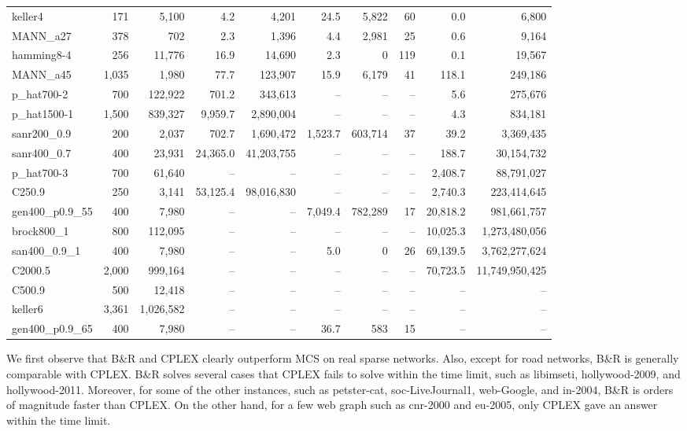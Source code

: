 \documentclass[11pt]{article}
\begin{document}
{\begin{table}[p]
\begin{tabular}{lrr|rr|rrr|rr}
keller4 & 171 & 5,100 & 4.2 & 4,201 & 24.5 & 5,822 & 60 & 0.0 & 6,800 \\
MANN\_a27 & 378 & 702 & 2.3 & 1,396 & 4.4 & 2,981 & 25 & 0.6 & 9,164 \\
hamming8-4 & 256 & 11,776 & 16.9 & 14,690 & 2.3 & 0 & 119 & 0.1 & 19,567 \\
MANN\_a45 & 1,035 & 1,980 & 77.7 & 123,907 & 15.9 & 6,179 & 41 & 118.1 & 249,186 \\
p\_hat700-2 & 700 & 122,922 & 701.2 & 343,613 & -- & -- & -- & 5.6 & 275,676 \\
p\_hat1500-1 & 1,500 & 839,327 & 9,959.7 & 2,890,004 & -- & -- & -- & 4.3 & 834,181 \\
sanr200\_0.9 & 200 & 2,037 & 702.7 & 1,690,472 & 1,523.7 & 603,714 & 37 & 39.2 & 3,369,435 \\
sanr400\_0.7 & 400 & 23,931 & 24,365.0 & 41,203,755 & -- & -- & -- & 188.7 & 30,154,732 \\
p\_hat700-3 & 700 & 61,640 & -- & -- & -- & -- & -- & 2,408.7 & 88,791,027 \\
C250.9 & 250 & 3,141 & 53,125.4 & 98,016,830 & -- & -- & -- & 2,740.3 & 223,414,645 \\
gen400\_p0.9\_55 & 400 & 7,980 & -- & -- & 7,049.4 & 782,289 & 17 & 20,818.2 & 981,661,757 \\
brock800\_1 & 800 & 112,095 & -- & -- & -- & -- & -- & 10,025.3 & 1,273,480,056 \\
san400\_0.9\_1 & 400 & 7,980 & -- & -- & 5.0 & 0 & 26 & 69,139.5 & 3,762,277,624 \\
C2000.5 & 2,000 & 999,164 & -- & -- & -- & -- & -- & 70,723.5 & 11,749,950,425 \\
C500.9 & 500 & 12,418 & -- & -- & -- & -- & -- & -- & -- \\
keller6 & 3,361 & 1,026,582 & -- & -- & -- & -- & -- & -- & -- \\
gen400\_p0.9\_65 & 400 & 7,980 & -- & -- & 36.7 & 583 & 15 & -- & -- \\
\bottomrule
\end{tabular}
\end{table}
}
 
We first observe that B\&R and CPLEX clearly outperform MCS on real sparse networks.
Also, except for road networks, B\&R is generally comparable with CPLEX.
B\&R solves several cases that CPLEX fails to solve within the time limit,
such as libimseti, hollywood-2009, and hollywood-2011.
Moreover, for some of the other instances,
such as petster-cat, soc-LiveJournal1, web-Google, and in-2004,
B\&R is orders of magnitude faster than CPLEX.
On the other hand, for a few web graph such as cnr-2000 and eu-2005,
only CPLEX gave an answer within the time limit.
\end{document}
